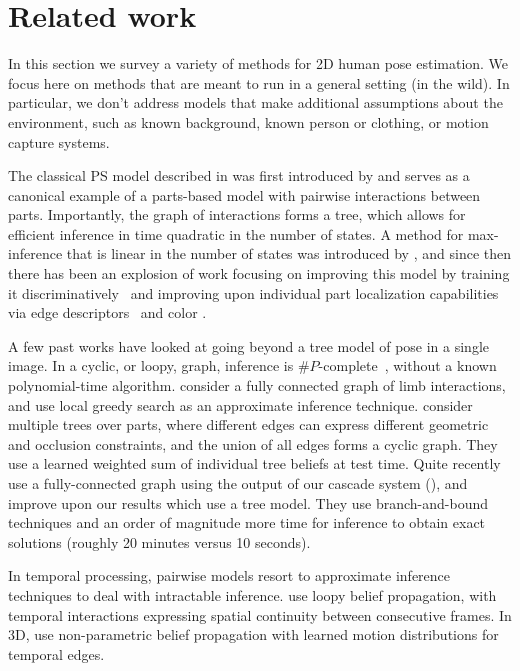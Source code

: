 \chapter{Related work}

In this section we survey a variety of methods for 2D human pose estimation.  
We focus here on methods that are meant to run in a general setting (\ie in the 
wild).  In particular, we don't address models that make additional assumptions 
about the environment, such as known background, known person or clothing, or 
motion capture systems.


 The classical PS model described in  was first 
introduced by \citet{fischler1973ps} and serves as a canonical example of a 
parts-based model with pairwise interactions between parts.  Importantly, the 
graph of interactions forms a tree, which allows for efficient inference in 
time quadratic in the number of states.  A method for max-inference that is 
linear in the number of states was introduced by \citet{felz05}, and since then 
there has been an explosion of work focusing on improving this model by 
training it discriminatively~\citep{devacrf,andriluka09} and improving upon 
individual part localization capabilities via edge 
descriptors~\citep{andriluka09} and color \citep{eichner09}.

A few past works have looked at going beyond a tree model of pose in a single 
image.  In a cyclic, or loopy, graph, inference is 
$\#P$-complete~\citep{koller-book}, without a known polynomial-time algorithm.  
\citet{ddtran} consider a fully connected graph of limb interactions, and use 
local greedy search as an approximate inference technique.  
\citet{wang2008multiple} consider multiple trees over parts, where different 
edges can express different geometric and occlusion constraints, and the union 
of all edges forms a cyclic graph.  They use a learned weighted sum of 
individual tree beliefs at test time.  Quite recently \citet{min-bb} use a 
fully-connected graph using the output of our cascade system (), 
and improve  upon our results which use a tree model.  They use 
branch-and-bound techniques and an order of magnitude more time for inference 
to obtain exact solutions (roughly 20 minutes versus 10 seconds).

In temporal processing, pairwise models resort to approximate inference 
techniques to deal with intractable inference.  \citet{ferrari08} use loopy 
belief propagation, with temporal interactions expressing spatial continuity 
between consecutive frames.  In 3D, \citet{sigal2004tracking} use 
non-parametric belief propagation with learned motion distributions for 
temporal edges.

